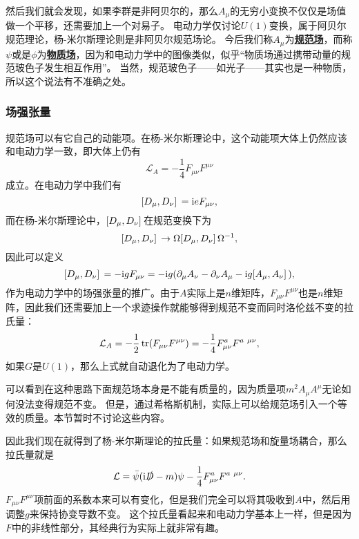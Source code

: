 \documentclass[hyperref, UTF8, a4paper]{ctexart}
\newcommand*{\ii}{\mathrm{i}}
\newcommand{\concept}[1]{\underline{\textbf{#1}}}
\begin{document}
然后我们就会发现，如果李群是非阿贝尔的，那么$A_\mu$的无穷小变换不仅仅是场值做一个平移，还需要加上一个对易子。
电动力学仅讨论$U(1)$变换，属于阿贝尔规范理论，杨-米尔斯理论则是非阿贝尔规范场论。
今后我们称$A_\mu$为\concept{规范场}，而称$\psi$或是$\phi$为\concept{物质场}，因为和电动力学中的图像类似，似乎“物质场通过携带动量的规范玻色子发生相互作用”。
当然，规范玻色子——如光子——其实也是一种物质，所以这个说法有不准确之处。

\subsubsection{场强张量}

规范场可以有它自己的动能项。在杨-米尔斯理论中，这个动能项大体上仍然应该和电动力学一致，即大体上仍有
\[
    \mathcal{L}_A = - \frac{1}{4} F_{\mu \nu} F^{\mu \nu}
\]
成立。在电动力学中我们有
\[
    \comm*{D_\mu}{D_\nu} = \ii e F_{\mu \nu},
\]
而在杨-米尔斯理论中，$\comm*{D_\mu}{D_\nu}$在规范变换下为
\[
    \comm*{D_\mu}{D_\nu} \to \Omega \comm*{D_\mu}{D_\nu} \Omega^{-1},
\]
因此可以定义
\begin{equation}
    \comm*{D_\mu}{D_\nu} = - \ii g F_{\mu \nu} = - \ii g (\partial_\mu A_\nu - \partial_\nu A_\mu - \ii g \comm*{A_\mu}{A_\nu}),
\end{equation}
作为电动力学中的场强张量的推广。由于$A$实际上是$n$维矩阵，$F_{\mu \nu} F^{\mu \nu}$也是$n$维矩阵，因此我们还需要加上一个求迹操作就能够得到规范不变而同时洛伦兹不变的拉氏量：
\begin{equation}
    \mathcal{L}_A = - \frac{1}{2} \trace(F_{\mu \nu} F^{\mu \nu}) = - \frac{1}{4} F_{\mu \nu}^a F^{a \ \mu \nu},
\end{equation}
如果$G$是$U(1)$，那么上式就自动退化为了电动力学。

可以看到在这种思路下面规范场本身是不能有质量的，因为质量项$m^2 A_\mu A^\mu$无论如何没法变得规范不变。
但是，通过希格斯机制，实际上可以给规范场引入一个等效的质量。本节暂时不讨论这些内容。

因此我们现在就得到了杨-米尔斯理论的拉氏量：如果规范场和旋量场耦合，那么拉氏量就是
\begin{equation}
    \mathcal{L} = \bar{\psi} (\ii \slashed{D} - m) \psi - \frac{1}{4} F_{\mu \nu}^a F^{a \ \mu \nu}.
    \label{eq:yang-mills-lagrangian}
\end{equation}
$F_{\mu \nu} F^{\mu \nu}$项前面的系数本来可以有变化，但是我们完全可以将其吸收到$A$中，然后用调整$g$来保持协变导数不变。
这个拉氏量看起来和电动力学基本上一样，但是因为$F$中的非线性部分，其经典行为实际上就非常有趣。
\end{document}
